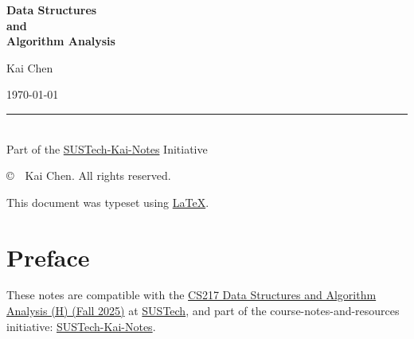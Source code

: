 \documentclass[12pt]{article}
\theoremstyle{blueplain}
\theoremstyle{bluedef}
\theoremstyle{blueremark}
\begin{document}

\begin{titlepage}
    \centering
    \vspace*{3cm}

    {\Huge \bfseries Data Structures \\ and \\ Algorithm Analysis \par}

    \vspace{4cm}

    {\Large Kai Chen \par}
    \vspace{0.5cm}
    {\large \today \par}

    \vfill

    \rule{0.8\textwidth}{0.4pt} \\
    \vspace{0.5cm}
    {\small Part of the \href{https://github.com/kaiiiichen/SUSTech-Kai-Notes/wiki}{SUSTech-Kai-Notes} Initiative}
\end{titlepage}

\newpage
\thispagestyle{empty}

\vspace*{\fill}

\begin{center}
    \copyright\ \the\year\ Kai Chen.
    All rights reserved.

    \vspace{0.5cm}

    \doclicenseThis

    \vspace{1cm}

    This document was typeset using \href{https://www.latex-project.org}{\LaTeX}.
\end{center}
\clearpage


\section*{Preface}
These notes are compatible with the \href{https://github.com/kaiiiichen/SUSTech-Kai-Notes/tree/main/CS217%20Data%20Structures%20and%20Algorithm%20Analysis%20(H)}{CS217 Data Structures and Algorithm Analysis (H) (Fall 2025)} at \href{https://www.sustech.edu.cn/}{SUSTech}, and part of the course-notes-and-resources initiative: \href{https://github.com/kaiiiichen/SUSTech-Kai-Notes/wiki}{SUSTech-Kai-Notes}.
\end{document}

